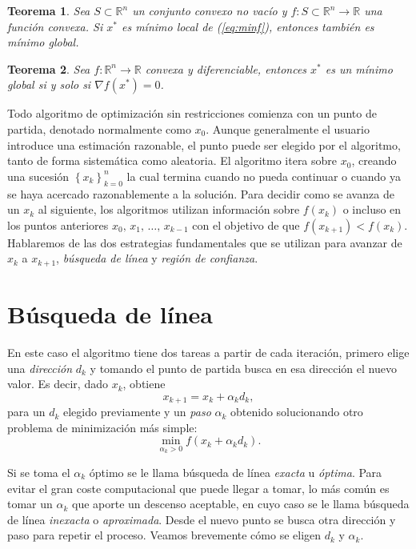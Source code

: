 \documentclass[11pt,a4paper]{book}
\newtheorem{theorem}{Teorema}[chapter]
\theoremstyle{definition}
\theoremstyle{remark}
\newcommand{\sucesionxk}{\left\{x_k\right\}}
\begin{document}
\begin{theorem}
	Sea $S \subset \mathbb{R}^n$ un conjunto convexo no vacío y
	$f:S \subset \mathbb{R}^n \rightarrow \mathbb{R}$ una función convexa. Si $x^*$ es mínimo
	local de (\ref{eq:minf}), entonces también es mínimo global.
\end{theorem}

\begin{theorem} \label{th:convx}
	Sea $f: \mathbb{R}^n \rightarrow \mathbb{R}$ convexa y diferenciable, entonces $x^*$ es un
	mínimo global si y solo si $\nabla f(x^*) = 0$.
\end{theorem}

Todo algoritmo de optimización sin restricciones comienza con un punto de partida, denotado
normalmente como $x_{0}$. Aunque generalmente el usuario introduce una estimación razonable,
el punto puede ser elegido por el algoritmo, tanto de forma sistemática como aleatoria.
El algoritmo itera sobre $x_{0}$, creando una sucesión $\sucesionxk_{k=0}^n$ la cual termina
cuando no pueda continuar o cuando ya se haya acercado razonablemente a la solución. Para decidir
como se avanza de un $x_k$ al siguiente, los algoritmos utilizan información sobre $f(x_k)$ o
incluso en los puntos anteriores $x_0,\, x_1,\, \ldots,\,x_{k-1}$ con el objetivo de que
$f(x_{k+1})<f(x_{k})$. Hablaremos de las dos estrategias fundamentales que se utilizan para
avanzar de $x_k$ a $x_{k+1}$, \textit{búsqueda de línea} y \textit{región de confianza}.

\section{Búsqueda de línea}

En este caso el algoritmo tiene dos tareas a partir de cada iteración, primero elige
una \textit{dirección} $d_k$ y tomando el punto de partida busca en esa dirección el
nuevo valor. Es decir, dado $x_k$, obtiene
\begin{equation} \label{eq:linesearch}
	x_{k+1} = x_k + \alpha_kd_k,
\end{equation}
para un $d_k$ elegido previamente y un \textit{paso} $\alpha_k$ obtenido solucionando
otro problema de minimización más simple:
\begin{equation} \label{min:alphak}
	\min_{\alpha_k>0}f\left(x_k+\alpha_kd_k\right).
\end{equation}

Si se toma el $\alpha_k$ óptimo se le llama búsqueda de línea \textit{exacta} u \textit{óptima}. Para evitar el gran coste computacional que puede llegar a tomar, lo más común es tomar un $\alpha_k$ que aporte un descenso aceptable, en cuyo caso se le llama búsqueda de línea \textit{inexacta} o \textit{aproximada}. Desde el nuevo punto se busca otra dirección y paso para repetir el proceso.
Veamos brevemente cómo se eligen $d_k$ y $\alpha_k$.
\end{document}
